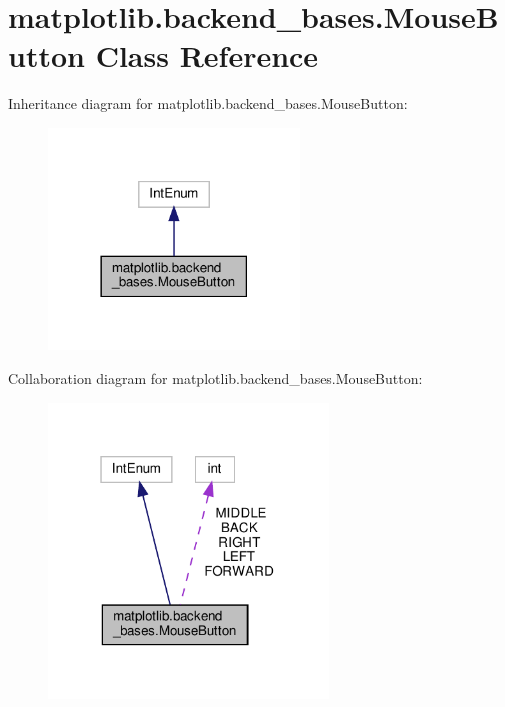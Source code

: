 \hypertarget{classmatplotlib_1_1backend__bases_1_1MouseButton}{}\section{matplotlib.\+backend\+\_\+bases.\+Mouse\+Button Class Reference}
\label{classmatplotlib_1_1backend__bases_1_1MouseButton}


Inheritance diagram for matplotlib.\+backend\+\_\+bases.\+Mouse\+Button\+:
\nopagebreak
\begin{figure}[H]
\begin{center}
\leavevmode
\includegraphics[width=189pt]{classmatplotlib_1_1backend__bases_1_1MouseButton__inherit__graph}
\end{center}
\end{figure}


Collaboration diagram for matplotlib.\+backend\+\_\+bases.\+Mouse\+Button\+:
\nopagebreak
\begin{figure}[H]
\begin{center}
\leavevmode
\includegraphics[width=211pt]{classmatplotlib_1_1backend__bases_1_1MouseButton__coll__graph}
\end{center}
\end{figure}
